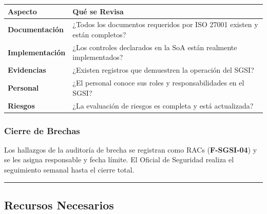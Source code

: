 \documentclass[10pt,letterpaper]{article}
\begin{document}
{\setlength{\RaggedRightRightskip}{0pt plus 5em}\small\sloppy \begin{longtable}[]{@{}
  >{\hspace{0pt}\RaggedRight\arraybackslash}p{}
  >{\hspace{0pt}\RaggedRight\arraybackslash}p{}@{}}
\toprule\noalign{}
\begin{minipage}[b]{\linewidth}\raggedright
Aspecto
\end{minipage} & \begin{minipage}[b]{\linewidth}\raggedright
Qué se Revisa
\end{minipage} \\
\midrule\noalign{}
\endhead
\bottomrule\noalign{}
\endlastfoot
\textbf{Documentación} & ¿Todos los documentos requeridos por ISO 27001
existen y están completos? \\
\textbf{Implementación} & ¿Los controles declarados en la SoA están
realmente implementados? \\
\textbf{Evidencias} & ¿Existen registros que demuestren la operación del
SGSI? \\
\textbf{Personal} & ¿El personal conoce sus roles y responsabilidades en
el SGSI? \\
\textbf{Riesgos} & ¿La evaluación de riesgos es completa y está
actualizada? \\
\end{longtable}\normalsize}

\subsubsection{Cierre de Brechas}\label{cierre-de-brechas}

Los hallazgos de la auditoría de brecha se registran como RACs
(\textbf{F-SGSI-04}) y se les asigna responsable y fecha límite. El
Oficial de Seguridad realiza el seguimiento semanal hasta el cierre
total.

\begin{center}\rule{0.5\linewidth}{0.5pt}\end{center}

\subsection{Recursos Necesarios}\label{recursos-necesarios}
\end{document}
